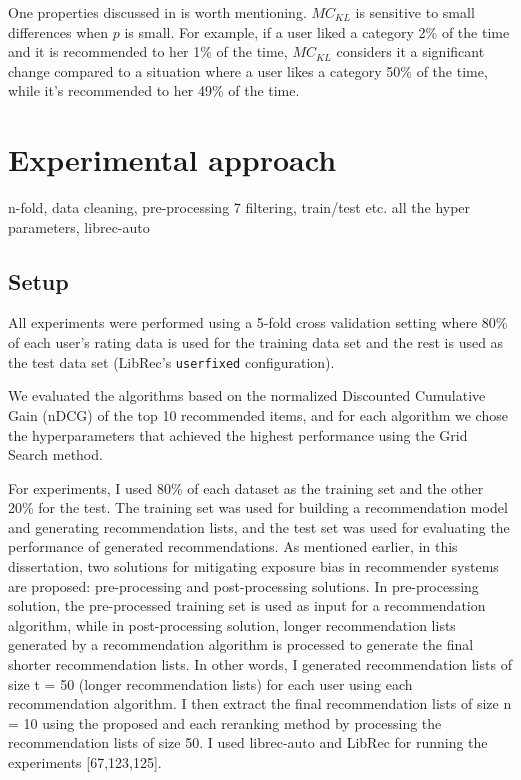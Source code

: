     One properties discussed in \cite{steck2018calibrated} is worth mentioning. $MC_{KL}$ is sensitive to small differences when $p$ is small. For example, if a user liked a category 2\% of the time and it is recommended to her 1\% of the time, $MC_{KL}$ considers it a significant change compared to a situation where a user likes a category 50\% of the time, while it's recommended to her 49\% of the time. 


\section{Experimental approach}
    n-fold, data cleaning, pre-processing 7 filtering, train/test etc.
    all the hyper parameters, librec-auto
    
    \subsection{Setup}
    All experiments were performed using a 5-fold cross validation setting where 80\% of each user's rating data is used for the training data set and the rest is used as the test data set (LibRec's \texttt{userfixed} configuration).
    
    We evaluated the algorithms based on the normalized Discounted Cumulative Gain (nDCG) of the top 10 recommended items, and for each algorithm we chose the hyperparameters that achieved the highest performance using the Grid Search method.
    
    For experiments, I used 80\% of each dataset as the training set and the other 20\% for the test. The training set was used for building a recommendation model and generating recommendation lists, and the test set was used for evaluating
    the performance of generated recommendations. As mentioned earlier, in this dissertation, two solutions for mitigating exposure bias in recommender systems are proposed: pre-processing and post-processing solutions. In pre-processing solution, the pre-processed training set is used as input
    for a recommendation algorithm, while in post-processing solution, longer recommendation lists generated by a recommendation algorithm is processed to generate the final shorter recommendation lists. In other words, I generated
    recommendation lists of size t = 50 (longer recommendation lists) for each user using each recommendation algorithm. I then extract the final recommendation lists of size n = 10 using the proposed and each reranking method by processing
    the recommendation lists of size 50.
    I used librec-auto and LibRec for running the experiments [67,123,125].
    

